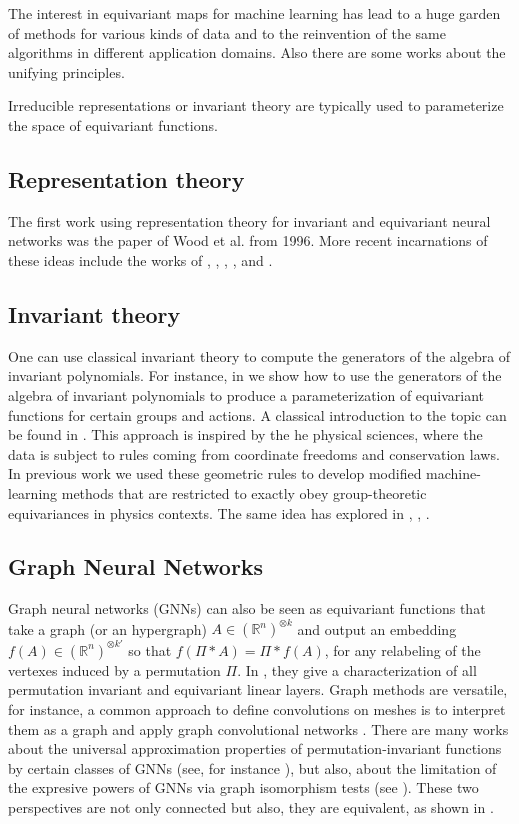 \documentclass{article}
\theoremstyle{definition}
\begin{document}
The interest in equivariant maps for machine learning has lead to a huge garden of methods for various kinds of data and to the reinvention of the same algorithms in different application domains. Also there are some works about the unifying principles. 

Irreducible representations or invariant theory are typically
used to parameterize the space of equivariant functions. 

\subsection{Representation theory}
The first work using representation theory for invariant and equivariant neural networks was the paper of  Wood et al. \cite{WOOD199633} from 1996. More recent incarnations of these ideas include the works of \cite{makadia}, \cite{ref4}, \cite{Cohen16}, \cite{cohen2019gauge}, \cite{de2020gauge} and \cite{esteves}.

\subsection{Invariant theory}
One can use classical invariant theory to compute the generators of the algebra of invariant polynomials. For instance, in \cite{2022blum-smith-villar-equivariant} we show how to use the generators of the algebra of invariant polynomials to produce a parameterization of equivariant functions for certain groups and actions. A classical introduction to the topic can be found in \cite{weyl}. This approach is inspired by the he physical sciences, where the data is subject to rules coming from coordinate freedoms and conservation laws. In previous work \cite{villar2021scalars, villar2022dimensionless, yao2021simple} we used these geometric rules to develop modified machine-learning methods that are restricted to exactly obey group-theoretic equivariances in physics contexts. The same idea has explored in \cite{haddadin2021invariant}, \cite{Gripaios_2021}, \cite{yao2021simple}.

\subsection{Graph Neural Networks}
Graph neural networks (GNNs) can also be seen as equivariant functions that take a graph (or an hypergraph) $A\in (\mathbb{R}^n)^{\otimes k}$ and output an embedding $f(A)\in (\mathbb{R}^n)^{\otimes k'}$ so that $f(\Pi *A)=\Pi*f(A)$, for any relabeling of the vertexes induced by a permutation $\Pi$. In \cite{maron2018invariant}, they give a characterization of all permutation invariant and equivariant linear layers. Graph methods are versatile, for instance, a common approach to define convolutions on meshes is to interpret them as a graph and apply graph convolutional networks \cite{de2020gauge}. There are many works about the universal approximation properties of permutation-invariant functions by certain classes of GNNs (see, for instance \cite{kumagai2020universal}), but also, about the limitation of the expresive powers of GNNs via graph isomorphism tests (see \cite{power}). These two perspectives are not only connected but also, they are equivalent, as shown in \cite{graphisotest}.
\end{document}
